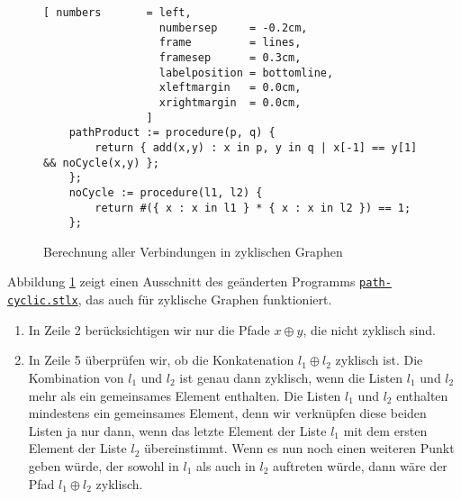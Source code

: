 \begin{figure}[!ht]
  \centering
\begin{Verbatim}[ numbers       = left,
                  numbersep     = -0.2cm,
                  frame         = lines, 
                  framesep      = 0.3cm, 
                  labelposition = bottomline,
                  xleftmargin   = 0.0cm,
                  xrightmargin  = 0.0cm,
                ]
    pathProduct := procedure(p, q) {
        return { add(x,y) : x in p, y in q | x[-1] == y[1] && noCycle(x,y) };
    };
    noCycle := procedure(l1, l2) {
        return #({ x : x in l1 } * { x : x in l2 }) == 1;
    };
\end{Verbatim} 
\vspace*{-0.3cm}
\caption{Berechnung aller Verbindungen in zyklischen Graphen}  
\label{fig:path-cyclic.stlx}
\end{figure} %

Abbildung \ref{fig:path-cyclic.stlx} zeigt einen Ausschnitt des ge\"{a}nderten Programms
\href{https://github.com/karlstroetmann/Logik/blob/master/SetlX/path-cyclic.stlx}{\texttt{path-cyclic.stlx}},
das auch f\"{u}r zyklische Graphen funktioniert. 
\begin{enumerate}
\item In Zeile 2 ber\"{u}cksichtigen wir nur die Pfade $x \oplus y$, die nicht zyklisch sind.
\item In Zeile 5 \"{u}berpr\"{u}fen wir, ob die Konkatenation  $l_1 \oplus l_2$ zyklisch ist.  Die
      Kombination von $l_1$ und $l_2$  ist genau dann 
      zyklisch, wenn die Listen $l_1$ und $l_2$ mehr als ein gemeinsames Element
      enthalten.  Die Listen $l_1$ und $l_2$ enthalten mindestens ein gemeinsames Element,
      denn wir verkn\"{u}pfen diese beiden Listen ja nur dann, wenn das letzte Element
      der Liste $l_1$ mit dem ersten Element der Liste $l_2$ \"{u}bereinstimmt.
      Wenn es nun noch einen weiteren Punkt geben w\"{u}rde, der sowohl in $l_1$ als auch in
      $l_2$ auftreten w\"{u}rde, dann w\"{a}re der Pfad $l_1 \oplus l_2$ zyklisch.
\end{enumerate}

